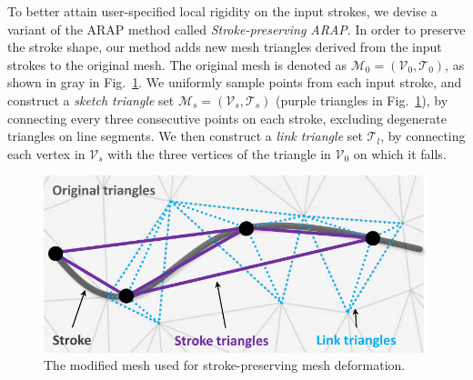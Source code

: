 To better attain user-specified local rigidity on the input strokes, 
we devise a variant of the ARAP method called {\em Stroke-preserving ARAP}. 
In order to preserve the stroke shape, our method adds new mesh triangles derived from the input strokes to the original  mesh. %
The original mesh is denoted as $ \mathcal{M}_0 = (\mathcal{V}_0, \mathcal{T}_0) $, as shown in gray in Fig.~\ref{fig:mesh}.
We uniformly sample points from each input stroke, and construct a \textit{sketch triangle} set $\mathcal{M}_s = (\mathcal{V}_s,\mathcal{T}_s) $ (purple triangles in Fig.~\ref{fig:mesh}), by connecting every three consecutive points on each stroke, excluding degenerate triangles on line segments. We then construct a \textit{link triangle} set $\mathcal{T}_l$, by connecting each vertex in $\mathcal{V}_s $ with the three vertices of the triangle in $\mathcal{V}_0$ on which it falls.

\begin{figure}
	\centering
	\includegraphics[width=0.85\linewidth]{images/mesh}
	\caption{The modified mesh used for stroke-preserving mesh deformation.}
	\label{fig:mesh}
\end{figure}


